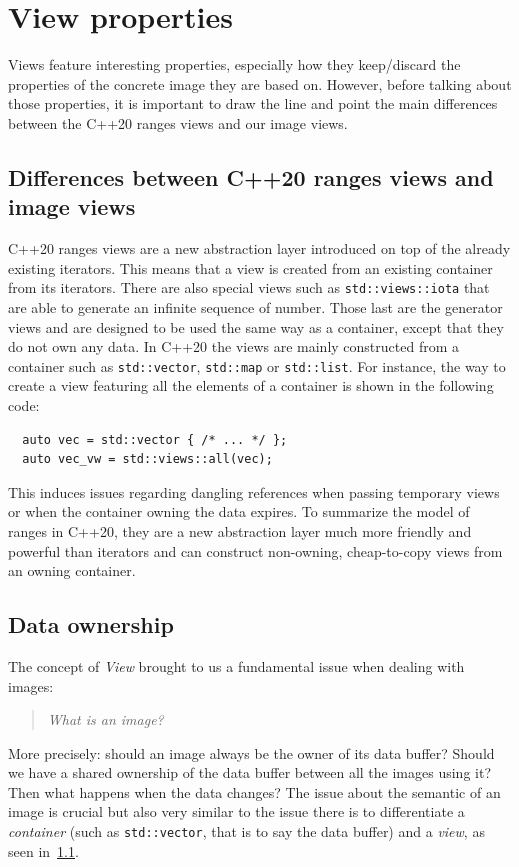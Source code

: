 \section{View properties}
\label{sec:views_properties}

Views feature interesting properties, especially how they keep/discard the properties of the concrete image they are
based on. However, before talking about those properties, it is important to draw the line and point the main
differences between the C++20 ranges views and our image views.

\subsection{Differences between C++20 ranges views and image views}
\label{subsec:C++20_views_vs_image_views}

C++20 ranges views are a new abstraction layer introduced on top of the already existing iterators. This means that a
view is created from an existing container from its iterators. There are also special views such as
\texttt{std::views::iota} that are able to generate an infinite sequence of number. Those last are the generator views
and are designed to be used the same way as a container, except that they do not own any data. In C++20 the views are
mainly constructed from a container such as \texttt{std::vector}, \texttt{std::map} or \texttt{std::list}. For instance,
the way to create a view featuring all the elements of a container is shown in the following code:
\begin{verbatim}
  auto vec = std::vector { /* ... */ };
  auto vec_vw = std::views::all(vec);
\end{verbatim}
This induces issues regarding dangling references when passing temporary views or when the container owning the data
expires. To summarize the model of ranges in C++20, they are a new abstraction layer much more friendly and powerful
than iterators and can construct non-owning, cheap-to-copy views from an owning container.

\subsection{Data ownership}

The concept of \emph{View} brought to us a fundamental issue when dealing with images: \blockquote{\emph{What is an
    image?}}. More precisely: should an image always be the owner of its data buffer? Should we have a shared ownership of
the data buffer between all the images using it? Then what happens when the data changes? The issue about the semantic
of an image is crucial but also very similar to the issue there is to differentiate a \emph{container} (such as
\texttt{std::vector}, that is to say the data buffer) and a \emph{view}, as seen
in~\cref{subsec:C++20_views_vs_image_views}.

